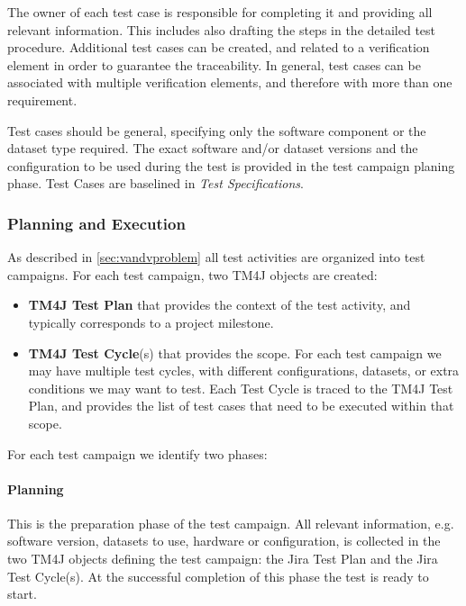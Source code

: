 The owner of each test case is responsible for completing it and providing all relevant information.
This includes also drafting the steps in the detailed test procedure.
Additional test cases can be created, and related to a verification element in order to guarantee the traceability.
In general, test cases can be associated with multiple verification elements, and therefore with more than one requirement.

Test cases should be general, specifying only the software component or the dataset type required.
The exact software and/or dataset versions and the configuration to be used during the test
is provided in the test campaign planing phase.
Test Cases are baselined in \textit{Test Specifications}.

\subsubsection{Planning and Execution}

As described in \ref{sec:vandvproblem} all test activities are organized into test campaigns.
For each test campaign, two TM4J objects are created:

\begin{itemize}
\item \textbf{TM4J Test Plan} that provides the context of the test activity, and typically corresponds to a project milestone.
\item \textbf{TM4J Test Cycle}(s) that provides the scope. For each test campaign we may have multiple test cycles,
with different configurations, datasets, or extra conditions we may want to test. Each Test Cycle is traced
to the TM4J Test Plan, and provides the list of test cases that need to be executed within that scope.
\end{itemize}

For each test campaign we identify two phases:

\paragraph{Planning}
This is the preparation phase of the test campaign. All relevant information, e.g. software version, datasets to use, 
hardware or configuration, is  collected in the two TM4J objects defining the test campaign:  the Jira Test Plan and the Jira Test Cycle(s).
At the successful completion of this phase the test is ready to start.

